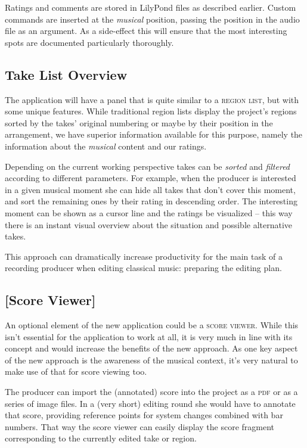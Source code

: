 \documentclass[11pt,a4paper]{article}
\newcommand*{\term}[1]{\textsc{#1}}
\begin{document}
Ratings and comments are stored in LilyPond files as described earlier. Custom
commands are inserted at the \emph{musical} position, passing the position in
the audio file as an argument. As a side-effect this will ensure that the most
interesting spots are documented particularly thoroughly.


\subsection{Take List Overview}
The application will have a panel that is quite similar to a \term{region
list}, but with some unique features.
While traditional region lists display the project's regions sorted by the
takes' original numbering or maybe by their position in the arrangement, we have
superior information available for this purpose, namely the information about the
\emph{musical} content and our ratings.

Depending on the current working perspective takes can be \emph{sorted} and 
\emph{filtered} according to different parameters.
For example, when the producer is interested in a given musical moment she can hide all
takes that don't cover this moment, and sort the remaining ones by their rating
in descending order.
The interesting moment can be shown as a cursor line and the ratings be visualized
-- this way there is an instant visual overview about the situation and possible
alternative takes.

This approach can dramatically increase productivity for the main task of a recording
producer when editing classical music: preparing the editing plan.

\subsection{[Score Viewer]}
An optional element of the new application could be a \term{score viewer}.
While this isn't essential for the application to work at all, it is very much in
line with its concept and would increase the benefits of the new approach.
As one key aspect of the new approach is the awareness of the musical context,
it's very natural to make use of that for score viewing too.

The producer can import the (annotated) score into the project as a \textsc{pdf} or as a
series of image files.
In a (very short) editing round she would have to annotate that score, providing
reference points for system changes combined with bar numbers.
That way the score viewer can easily display the score fragment corresponding to
the currently edited take or region.
\end{document}
